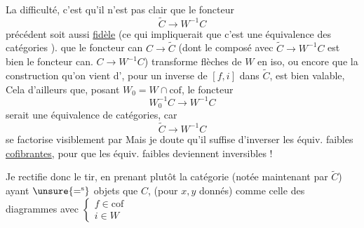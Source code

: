 
La difficulté, c'est qu'il n'est pas clair que le foncteur
\[\widetilde C\longrightarrow W^{-1}C\]
précédent soit aussi \uline{fidèle} (ce qui impliquerait que c'est une équivalence des catégories ).   que le foncteur can $C\longrightarrow\widetilde C$ (dont le composé avec $\widetilde C\longrightarrow W^{-1}C$ est bien le foncteur can. $C\longrightarrow W^{-1}C$) transforme flèches de $W$ en iso, ou encore que la construction qu'on vient d', pour   un inverse de $[f,i]$ dans $\widetilde C$, est bien valable, 
Cela  d'ailleurs  que,  posant $W_0=W\cap\mathrm{cof}$, le foncteur
\[W_0^{-1}C\longrightarrow W^{-1}C\]
serait une équivalence de catégories, car
\[\widetilde C\longrightarrow W^{-1}C\]
se factorise visiblement par
Mais je doute qu'il suffise d'inverser les équiv. faibles \uline{cofibrantes}, pour que  les équiv. faibles deviennent inversibles !

Je rectifie donc le tir, en prenant plutôt la catégorie (notée maintenant par $\widetilde C$) ayant $\unsure{=^{\mathrm{s}}}$ objets que $C$,     (pour $x,y$ donnés) comme celle des diagrammes
avec $\left\{\begin{array}{l}f\in\mathrm{cof}\\i\in W\end{array}\right.$

